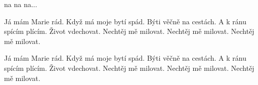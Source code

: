 \beginverse{}
\chordsoff{}
na na na...     
\chordson{}
\endverse{}

\repeatingchorus{}
\beginchorus{}
\chordsoff{}
Já mám Marie rád. Když má moje bytí spád.
Býti věčně na cestách. A k ránu spícím plícím.
Život vdechovat. Nechtěj mě milovat.
Nechtěj mě milovat. Nechtěj mě milovat. 
\chordson{}
\endchorus{}

\repeatingchorus{}
\beginchorus{}
\chordsoff{}
Já mám Marie rád. Když má moje bytí spád.
Býti věčně na cestách. A k ránu spícím plícím.
Život vdechovat. Nechtěj mě milovat.
Nechtěj mě milovat. Nechtěj mě milovat. 
\chordson{}
\endchorus{}

\endsong{}
